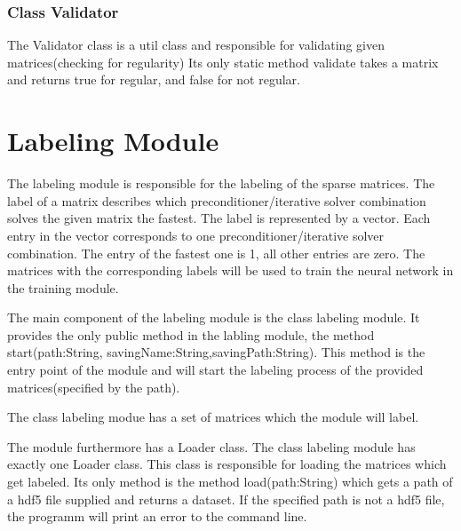 \documentclass[parskip=full]{scrartcl}
\begin{document}
\subsubsection{Class Validator}

The Validator class is a util class and responsible for validating given matrices(checking for regularity)
 Its only static method validate takes a matrix and returns true for regular, and false for not regular.

\section{Labeling Module}
The labeling module is responsible for the labeling of the sparse matrices. The \gls{label} of a matrix describes which \gls{preconditioner}/\gls{iterative solver} combination solves the given matrix the fastest. The \gls{label} is represented by a vector. Each entry in the vector corresponds to one \gls{preconditioner}/\gls{iterative solver} combination. The entry of the fastest one is 1, all other entries are zero. The matrices with the corresponding \glspl{label} will be used to train the neural network in the training module.

The main component of the labeling module is the class labeling module. It provides the only public method in the labling module, the method start(path:String, savingName:String,savingPath:String). This method is the entry point of the module and will start the labeling process of the provided matrices(specified by the path). \newline\newline

The class labeling modue has a set of matrices which the module will label.\newline\newline

The module furthermore has a Loader class. The class labeling module has exactly one Loader class. This class is responsible for loading the matrices which get labeled. Its only method is the method load(path:String) which gets a path of a hdf5 file supplied and returns a dataset. If the specified path is not a hdf5 file, the programm will print an error to the command line. \newline\newline
\end{document}
